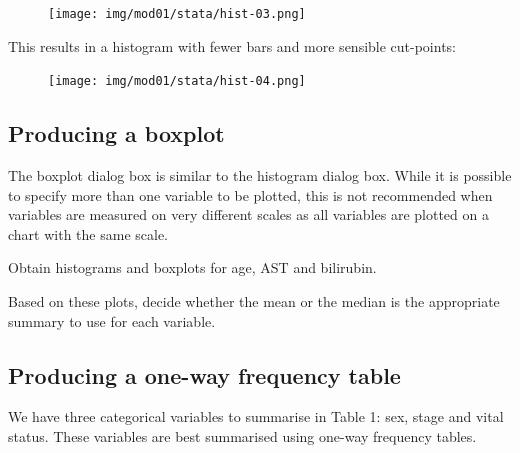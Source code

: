 \documentclass[
  a4paper,
]{memoir}
\begin{document}
\begin{figure}[H]

{\centering \texttt{[image: img/mod01/stata/hist-03.png]}

}

\end{figure}

This results in a histogram with fewer bars and more sensible
cut-points:

\begin{figure}[H]

{\centering \texttt{[image: img/mod01/stata/hist-04.png]}

}

\end{figure}

\hypertarget{producing-a-boxplot}{%
\subsection{Producing a boxplot}\label{producing-a-boxplot}}

The boxplot dialog box is similar to the histogram dialog box. While it
is possible to specify more than one variable to be plotted, this is not
recommended when variables are measured on very different scales as all
variables are plotted on a chart with the same scale.

\begin{tcolorbox}[enhanced jigsaw, title={TASK}, opacitybacktitle=0.6, colbacktitle=quarto-callout-note-color!10!white, titlerule=0mm, colframe=quarto-callout-note-color-frame, opacityback=0, left=2mm, breakable, bottomtitle=1mm, coltitle=black, bottomrule=.15mm, arc=.35mm, rightrule=.15mm, toptitle=1mm, colback=white, toprule=.15mm, leftrule=.75mm]

Obtain histograms and boxplots for age, AST and bilirubin.

Based on these plots, decide whether the mean or the median is the
appropriate summary to use for each variable.

\end{tcolorbox}

\hypertarget{producing-a-one-way-frequency-table}{%
\subsection{Producing a one-way frequency
table}\label{producing-a-one-way-frequency-table}}

We have three categorical variables to summarise in Table 1: sex, stage
and vital status. These variables are best summarised using one-way
frequency tables.
\end{document}
